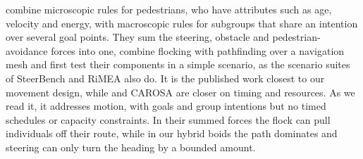 \citet{Agent}\label{sec:soa-saeed} combine microscopic rules for pedestrians, who have attributes such as age, velocity and energy, with macroscopic rules for subgroups that share an intention over several goal points. They sum the steering, obstacle and pedestrian-avoidance forces into one, combine flocking with pathfinding over a navigation mesh \citep{hart1968formal,snook2000simplified} and first test their components in a simple scenario, as the scenario suites of SteerBench \citep{singh2009steerbench} and RiMEA \citep{rimea2025guideline} also do. It is the published work closest to our movement design, while \citet{shao2007autonomous} and CAROSA \citep{allbeck2010carosa} are closer on timing and resources. As we read it, it addresses motion, with goals and group intentions but no timed schedules or capacity constraints. In their summed forces the flock can pull individuals off their route, while in our hybrid boids the path dominates and steering can only turn the heading by a bounded amount.


